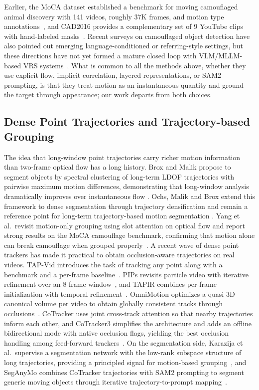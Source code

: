 \documentclass[11pt]{article}
\begin{document}
Earlier, the MoCA dataset established a benchmark for moving camouflaged animal discovery with 141 videos, roughly 37K frames, and motion type annotations~\cite{moca}, and CAD2016 provides a complementary set of 9 YouTube clips with hand-labeled masks~\cite{cad2016}.
Recent surveys on camouflaged object detection have also pointed out emerging language-conditioned or referring-style settings, but these directions have not yet formed a mature closed loop with VLM/MLLM-based VRS systems~\cite{codsurvey}.
What is common to all the methods above, whether they use explicit flow, implicit correlation, layered representations, or SAM2 prompting, is that they treat motion as an instantaneous quantity and ground the target through appearance; our work departs from both choices.

\subsection{Dense Point Trajectories and Trajectory-based Grouping}
The idea that long-window point trajectories carry richer motion information than two-frame optical flow has a long history. Brox and Malik propose to segment objects by spectral clustering of long-term LDOF trajectories with pairwise maximum motion differences, demonstrating that long-window analysis dramatically improves over instantaneous flow \cite{broxmalik}. Ochs, Malik and Brox extend this framework to dense segmentation through trajectory densification and remain a reference point for long-term trajectory-based motion segmentation \cite{ochs2014}. Yang et al.\ revisit motion-only grouping using slot attention on optical flow and report strong results on the MoCA camouflage benchmark, confirming that motion alone can break camouflage when grouped properly~\cite{yang2021}.
A recent wave of dense point trackers has made it practical to obtain occlusion-aware trajectories on real videos. TAP-Vid introduces the task of tracking any point along with a benchmark and a per-frame baseline~\cite{tapvid}. PIPs revisits particle video with iterative refinement over an 8-frame window~\cite{pips}, and TAPIR combines per-frame initialization with temporal refinement~\cite{tapir}. OmniMotion optimizes a quasi-3D canonical volume per video to obtain globally consistent tracks through occlusions~\cite{omnimotion}. CoTracker uses joint cross-track attention so that nearby trajectories inform each other, and CoTracker3 simplifies the architecture and adds an offline bidirectional mode with native occlusion flags, yielding the best occlusion handling among feed-forward trackers~\cite{cotracker3}.
On the segmentation side, Karazija et al.\ supervise a segmentation network with the low-rank subspace structure of long trajectories, providing a principled signal for motion-based grouping~\cite{karazija}, and SegAnyMo combines CoTracker trajectories with SAM2 prompting to segment generic moving objects through iterative trajectory-to-prompt mapping~\cite{seganymo}.
\end{document}
